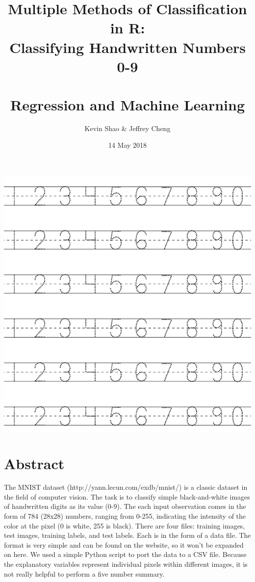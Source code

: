 \documentclass[10pt]{extarticle}
\title{Multiple Methods of Classification in R:\\ Classifying Handwritten Numbers 0-9\\\textrm{ }\\\large Regression and Machine Learning}
\date{14 May 2018}
\author{Kevin Shao \& Jeffrey Cheng}
\begin{document}
\allowdisplaybreaks
{}
\renewcommand{\labelitemi}{$>$}
\maketitle
\begin{center}

\includegraphics[scale=0.5]{numbers.png}

\end{center}
\newpage

\section{Abstract}

The MNIST dataset (http://yann.lecun.com/exdb/mnist/) is a classic dataset in the field of computer vision. The task is to classify simple black-and-white images of handwritten digits as its value (0-9). The each input observation comes in the form of 784 (28x28) numbers, ranging from 0-255, indicating the intensity of the color at the pixel (0 is white, 255 is black). There are four files: training images, test images, training labels, and test labels. Each is in the form of a data file. The format is very simple and can be found on the website, so it won't be expanded on here. We used a simple Python script to port the data to a CSV file.
Because the explanatory variables represent individual pixels within different images, it is not really helpful to perform a five number summary. 
\end{document}
